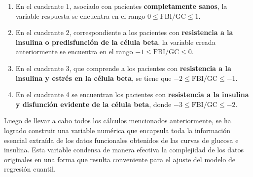 \begin{enumerate}
    \item En el cuadrante $1$, asociado con pacientes \textbf{completamente sanos}, la variable respuesta se encuentra en el rango $0 \leq \text{FBI/GC} \leq 1$.
    \item En el cuadrante $2$, correspondiente a los pacientes con \textbf{resistencia a la insulina o predisfunción de la célula beta}, la variable creada anteriormente se encuentra en el rango $-1 \leq \text{FBI/GC} \leq 0$.
    \item En el cuadrante $3$, que comprende a los pacientes con \textbf{resistencia a la insulina y estrés en la célula beta}, se tiene que $-2 \leq \text{FBI/GC} \leq -1$.
    \item En el cuadrante 4 se encuentran los pacientes con \textbf{resistencia a la insulina y disfunción evidente de la célula beta}, donde $-3 \leq \text{FBI/GC} \leq -2$.
\end{enumerate}

 Luego de llevar a cabo todos los cálculos mencionados anteriormente, se ha logrado construir una variable numérica que encapsula toda la información esencial extraída de los datos funcionales obtenidos de las curvas de glucosa e insulina. Esta variable condensa de manera efectiva la complejidad de los datos originales en una forma que resulta conveniente para el ajuste del modelo de regresión cuantil.